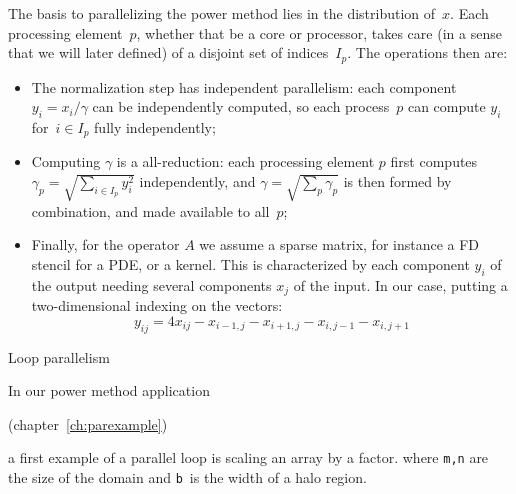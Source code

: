 The basis to parallelizing the power method lies in the distribution of~$x$.
Each processing element~$p$, whether that be a core or processor,
takes care (in a sense that we will later defined)
of a disjoint set of indices~$I_p$.
The operations then are:
\begin{itemize}
\item The normalization step has independent parallelism:
  each component $y_i=x_i/\gamma$ can be independently computed,
  so each process~$p$ can compute $y_i$ for~$i\in I_p$ fully independently;
\item Computing $\gamma$ is a all-reduction:
  each processing element $p$ first computes $\gamma_p=\sqrt{\sum_{i\in I_p}y_i^2}$
  independently,
  and $\gamma=\sqrt{\sum_p\gamma_p}$ is then formed by combination, and
  made available to all~$p$;
\item Finally, for the operator $A$ we assume a sparse matrix,
  for instance a \acf{FD} stencil for a \ac{PDE}, or a  kernel.
  This is characterized by each component $y_i$ of the output needing several
  components $x_j$ of the input. In our case, putting a two-dimensional
  indexing on the vectors:
  \[ y_{ij} = 4x_{ij} - x_{i-1,j} -x_{i+1,j} - x_{i,j-1} - x_{i,j+1} \]
\end{itemize}


 {Loop parallelism}
\label{sec:d2d-omp1d}

In our power method application
\begin{packt}
  (chapter~\ref{ch:parexample})
\end{packt}
a first example of a parallel loop is scaling an array by a factor.
%
%
where \lstinline{m,n} are the size of the domain and \lstinline{b}~is the
width of a halo region.

